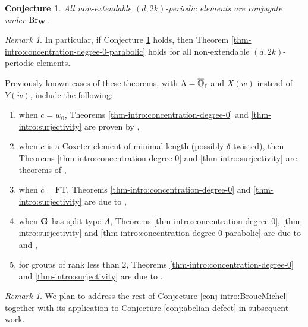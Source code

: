 \documentclass[article, 10pt, oneside, reqno]{amsart}
\theoremstyle{plain}
\newtheorem{conj}[thm]{Conjecture}
\theoremstyle{definition}
\theoremstyle{remark}
\newtheorem{rque}[thm]{Remark}
\newcommand{\FT}{\mathrm{FT}}
\begin{document}
\begin{conj}\label{conj-intro:conj-of-non-extendable-roots}
All non-extendable $(d,2k)$-periodic elements are conjugate under $\mathrm{Br}_{\mathbf{W}}$.
\end{conj}

\begin{rque}
In particular, if Conjecture \ref{conj-intro:conj-of-non-extendable-roots} holds, then Theorem \ref{thm-intro:concentration-degree-0-parabolic} holds for all non-extendable $(d,2k)$-periodic elements.
\end{rque}

Previously known cases of these theorems, with $\Lambda = \overline{\mathbb{Q}}_{\ell}$ and $X(w)$ instead of $Y(\dot{w})$, include the following:  
\begin{enumerate}
\item when $c = w_0$, Theorems \ref{thm-intro:concentration-degree-0} and \ref{thm-intro:surjectivity} are proven by \cite{LusztigRepFiniteChevalleyGroups},
\item when $c$ is a Coxeter element of minimal length (possibly $\delta$-twisted), then Theorems \ref{thm-intro:concentration-degree-0} and \ref{thm-intro:surjectivity} are theorems of \cite{LusztigCoxeterOrbits},
\item when $c = \FT$, Theorems \ref{thm-intro:concentration-degree-0} and \ref{thm-intro:surjectivity} are due to \cite{BonnafeDudasRouquier}, 
\item when $\mathbf{G}$ has split type $A$, Theorems \ref{thm-intro:concentration-degree-0}, \ref{thm-intro:surjectivity} and \ref{thm-intro:concentration-degree-0-parabolic} are due to \cite{DudasCohomologyDLTypeA} and \cite{BonnafeDudasRouquier},
\item for groups of rank less than $2$, Theorems \ref{thm-intro:concentration-degree-0} and \ref{thm-intro:surjectivity} are due to \cite{DigneMichelRouquier}.
\end{enumerate}

\begin{rque}
We plan to address the rest of Conjecture \ref{conj-intro:BroueMichel} together with its application to Conjecture \ref{conj:abelian-defect} in subsequent work. 
\end{rque}
\end{document}
